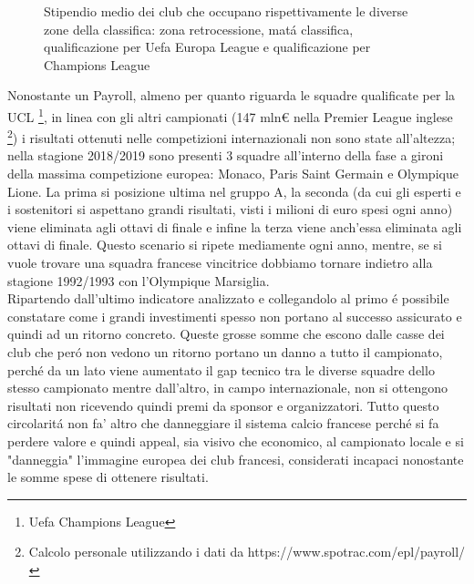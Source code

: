 \documentclass[
    corpo=11.5pt,
    oneside,
    evenboxes,
    tipotesi=triennale,
    stile=classica,
    oldstyle,
    autoretitolo,
    greek,
]{toptesi}
\begin{document}
\begin{interlinea}{1.5}
\begin{figure}
    \caption{Stipendio medio dei club che occupano rispettivamente le diverse zone della classifica: zona retrocessione, 
    mat\'a classifica, qualificazione per Uefa Europa League e qualificazione per Champions League}
    \label{stipendi_ligue1}
\end{figure}

Nonostante un Payroll, almeno per quanto riguarda le squadre qualificate per la UCL \footnote{Uefa Champions League}, in linea con gli
altri campionati (147 mln€ nella Premier League inglese \footnote{Calcolo personale utilizzando i dati da https://www.spotrac.com/epl/payroll/})
i risultati ottenuti nelle competizioni internazionali non sono state all'altezza; nella stagione 2018/2019 sono presenti 3 squadre 
all'interno della fase a gironi della massima competizione europea: Monaco, Paris Saint Germain e Olympique Lione. La prima si 
posizione ultima nel gruppo A, la seconda (da cui gli esperti e i sostenitori si aspettano grandi risultati, visti i milioni di euro 
spesi ogni anno) viene eliminata agli ottavi di finale e infine la terza viene anch'essa eliminata agli ottavi di finale. Questo scenario
si ripete mediamente ogni anno, mentre, se si vuole trovare una squadra francese vincitrice dobbiamo tornare indietro alla stagione 1992/1993
con l'Olympique Marsiglia.\\
Ripartendo dall'ultimo indicatore analizzato e collegandolo al primo \'e possibile constatare come i grandi investimenti spesso non portano 
al successo assicurato e quindi ad un ritorno concreto. Queste grosse somme che escono dalle casse dei club che per\'o
non vedono un ritorno portano un danno a tutto il campionato, perch\'e da un lato viene aumentato il gap tecnico tra le diverse squadre dello
stesso campionato mentre dall'altro, in campo internazionale, non si ottengono risultati non ricevendo quindi premi da sponsor e organizzatori.
Tutto questo circolarit\'a non fa' altro che danneggiare il sistema calcio francese perch\'e si fa perdere valore e quindi appeal, sia 
visivo che economico, al campionato locale e si "danneggia" l'immagine europea dei club francesi, considerati incapaci nonostante le somme spese
di ottenere risultati.


\end{interlinea}
\end{document}
